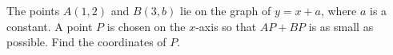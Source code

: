 The points $A(1,2)$ and $B(3,b)$ lie on the graph of $y=x+a$, where $a$ is a constant. A point $P$ is chosen on the $x$-axis so that $AP+BP$ is as small as possible. Find the coordinates of $P$.
